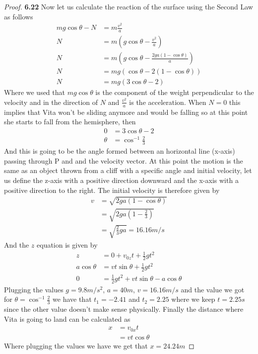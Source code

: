 \documentclass[11pt]{article}
\theoremstyle{definition}
\begin{document}
\begin{proof}{\textbf{6.22}}
        Now let us calculate the reaction of the surface using the Second Law as follows
        \begin{align*}
            mg\cos\theta - N &= m\frac{v^2}{a}\\
            N &= m(g\cos\theta - \frac{v^2}{a})\\
            N &= m(g\cos\theta - \frac{2ga(1 - \cos\theta)}{a})\\ 
            N &= mg(\cos\theta - 2(1 - \cos\theta))\\
            N &= mg(3\cos\theta - 2)
        \end{align*}
        Where we used that $mg\cos\theta$ is the component of the weight perpendicular
        to the velocity and in the direction of $N$ and $\frac{v^2}{a}$ is the
        acceleration.
        When $N=0$ this implies that Vita won't be sliding anymore and would be falling
        so at this point she starts to fall from the hemisphere, then
        \begin{align*}
            0 &= 3\cos\theta - 2\\
            \theta &= \cos^{-1} \frac{2}{3}
        \end{align*}
        And this is going to be the angle formed between an horizontal line (x-axis)
        passing through P and and the velocity vector. At this point the motion is
        the same as an object thrown from a cliff with a specific angle and initial
        velocity, let us define the z-axis with a positive direction downward and the
        x-axis with a positive direction to the right. The initial velocity is therefore
        given by
        \begin{align*}
            v &= \sqrt{2ga(1 - \cos\theta)}\\
                &= \sqrt{2ga(1 - \frac{2}{3})}\\
                &= \sqrt{\frac{2}{3}ga} = 16.16 m/s
        \end{align*} 
        And the $z$ equation is given by
        \begin{align*}
            z &= 0 + v_{0z}t + \frac{1}{2}gt^2\\
            a\cos\theta &= vt\sin\theta + \frac{1}{2}gt^2\\
            0 &= \frac{1}{2}gt^2 + vt\sin\theta - a\cos\theta
        \end{align*}
        Plugging the values $g=9.8 m/s^2$, $a=40m$, $v=16.16m/s$ and the value we got for
        $\theta = \cos^{-1}\frac{2}{3}$ we have that $t_1 = -2.41$ and $t_2 = 2.25$ where
        we keep $t = 2.25 s$ since the other value doesn't make sense physically.
        Finally the distance where Vita is going to land can be calculated as
        \begin{align*}
            x &= v_{0x}t\\
              &= vt\cos\theta 
        \end{align*}
        Where plugging the values we have we get that $x= 24.24m$
    \end{proof}
\end{document}
